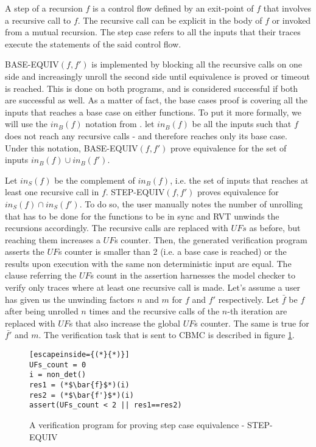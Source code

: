 \os{This notion is used only in 3.5? ] Then it should be there.} 
\begin{definition}[Step]
\label{def:step}


A step of a recursion $f$ is a control flow defined by an exit-point of $f$ that involves a recursive call to $f$. The recursive call can be explicit in the body of $f$ or invoked from a mutual recursion. The step case refers to all the inputs that their traces execute the statements of the said control flow.    
\end{definition}

BASE-EQUIV$(f,f')$ is implemented by blocking all the recursive calls on one side and increasingly unroll the second side until equivalence is proved or timeout is reached. This is done on both programs, and is considered successful if both are successful as well. As a matter of fact, the base cases proof is covering all the inputs that reaches a base case on either functions. To put it more formally, we will use the $in_B(f)$ notation from \cite{DBLP:conf/fm/StrichmanV16}. let $in_B(f)$ be all the inputs such that $f$  does not reach any recursive calls - and therefore reaches only its base case. Under this notation, BASE-EQUIV$(f,f')$ prove equivalence for the set of inputs $in_B(f) \cup in_B(f')$.

Let $in_S(f)$ be the complement of $in_B(f)$, i.e. the set of inputs that reaches at least one recursive call in $f$. STEP-EQUIV$(f,f')$ proves equivalence for $in_S(f) \cap in_S(f')$. To do so, the user manually notes the number of unrolling that has to be done for the functions to be in sync and RVT unwinds the recursions accordingly. The recursive calls are replaced with $UFs$ as before, but reaching them increases a $UF$s counter. Then, the generated verification program asserts the $UF$s counter is smaller than 2 (i.e. a base case is reached) or the results upon execution with the same non deterministic input are equal. The clause referring the $UF$s count in the assertion harnesses the model checker to verify only traces where at least one recursive call is made. Let's assume a user has given us the unwinding factors $n$ and $m$ for $f$ and $f'$ respectively. Let $\bar{f}$ be $f$ after being unrolled $n$ times and the recursive calls of the $n$-th iteration are replaced with $UF$s that also increase the global $UF$s counter. The same is true for $\bar{f'}$ and $m$. The verification task that is sent to CBMC is described in figure \ref{fig:rvtstepcase}.
\begin{figure} [h]
\begin{center}
\begin{minipage}{7 cm}
\begin{lstlisting}[escapeinside={(*}{*)}]
UFs_count = 0
i = non_det()
res1 = (*$\bar{f}$*)(i)
res2 = (*$\bar{f'}$*)(i)
assert(UFs_count < 2 || res1==res2)
\end{lstlisting}
\end{minipage}
\caption{A verification program for proving step case equivalence - STEP-EQUIV}
\label{fig:rvtstepcase}
\end{center}
\end{figure}

